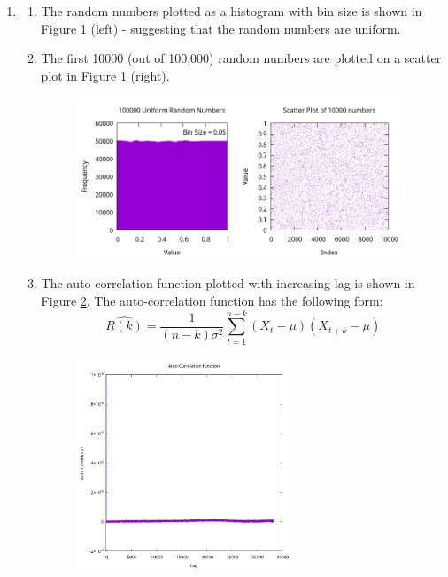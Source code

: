 \documentclass[11 pt]{article}
\begin{document}
\begin{enumerate}
\item
\begin{enumerate}
\item
The random numbers plotted as a histogram with bin size is shown in Figure \ref{fig2} (left) - suggesting that the random numbers are uniform.
\item
The first 10000 (out of 100,000) random numbers are plotted on a scatter plot in Figure \ref{fig2} (right).
\begin{figure}[h]
\begin{center}
\label{fig2}
\includegraphics[width=3.8in]{"plots/q2_ab.png"}
\end{center}
\end{figure}
\item
The auto-correlation function plotted with increasing lag is shown in Figure \ref{fig3}. The auto-correlation function has the following form:
\[
\hat{R(k)}=\frac{1}{(n-k)\sigma^2}\sum_{t=1}^{n-k} (X_t-\mu)(X_{t+k}-\mu)
\] 
\begin{figure}[h]
\begin{center}
\label{fig3}
\includegraphics[width=2.5in]{"plots/q2_c_correlation.png"}
\end{center}
\end{figure}


\end{enumerate}
\end{enumerate}
\end{document}

